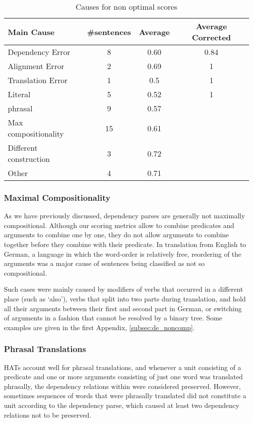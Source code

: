 \begin{table}[!ht]
\centering
\begin{tabular}{|l|c|c|c|}
\hline
\textbf{Main Cause} & \textbf{\#sentences} & \textbf{Average} & \textbf{Average Corrected}\\
\hline \hline
Dependency Error & 8 & 0.60 & 0.84\\
\hline
Alignment Error & 2 & 0.69 & 1\\
\hline
Translation Error & 1 & 0.5 & 1\\
\hline
Literal & 5 & 0.52 & 1\\
\hline
phrasal& 9 & 0.57\\
\cline{1-3}
Max compositionality & 15 & 0.61 \\
\cline{1-3}
Different construction & 3 & 0.72 \\
\cline{1-3}
Other & 4 & 0.71\\
\cline{1-3}
\end{tabular}
\caption{Causes for non optimal scores}\label{tab:non_optimal}
\end{table}

\subsubsection{Maximal Compositionality}

As we have previously discussed, dependency parses are generally not maximally compositional. Although our scoring metrics allow to combine predicates and arguments to combine one by one, they do not allow arguments to combine together before they combine with their predicate. In translation from English to German, a language in which the word-order is relatively free, reordering of the arguments was a major cause of sentences being classified as not so compositional. 

Such cases were mainly caused by modifiers of verbs that occurred in a different place (such as `also'), verbs that split into two parts during translation, and hold all their arguments between their first and second part in German, or switching of arguments in a fashion that cannot be resolved by a binary tree. Some examples are given in the first Appendix, \ref{subsec:de_noncomp}.

\subsubsection{Phrasal Translations}

HATs account well for phrasal translations, and whenever a unit consisting of a predicate and one or more arguments consisting of just one word was translated phrasally, the dependency relations within were considered preserved. However, sometimes sequences of words that were phrasally translated did not constitute a unit according to the dependency parse, which caused at least two dependency relations not to be preserved. 


